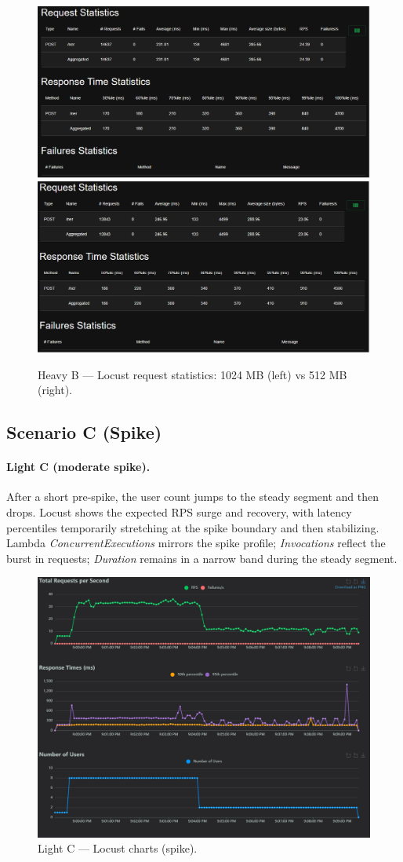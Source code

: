 \documentclass[11pt,a4paper]{article}
\begin{document}
\begin{figure}[h!] \centering
  \includegraphics[width=.49\linewidth]{"figures/hB - Stats.png"}\hfill
  \includegraphics[width=.49\linewidth]{"figures/hBl - Stats.png"}
  \caption{Heavy B --- Locust request statistics: 1024 MB (left) vs 512 MB (right).}
\end{figure}

\subsection{Scenario C (Spike)}\label{subsec:resC}

\paragraph{Light C (moderate spike).}
After a short pre-spike, the user count jumps to the steady segment and then drops. Locust shows the expected RPS surge and recovery, with latency percentiles temporarily stretching at the spike boundary and then stabilizing. Lambda \emph{ConcurrentExecutions} mirrors the spike profile; \emph{Invocations} reflect the burst in requests; \emph{Duration} remains in a narrow band during the steady segment.

\begin{figure}[h!] \centering
  \includegraphics[width=\linewidth]{"figures/lC - Charts.png"}
  \caption{Light C --- Locust charts (spike).}
\end{figure}
\end{document}
